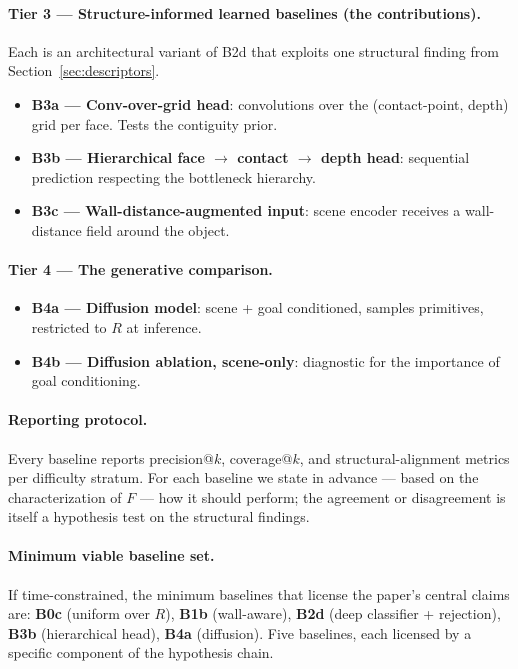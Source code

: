 \documentclass[11pt]{article}
\begin{document}
\paragraph{Tier 3 --- Structure-informed learned baselines (the contributions).}
Each is an architectural variant of B2d that exploits one structural finding
from Section~\ref{sec:descriptors}.
\begin{itemize}[leftmargin=2em,itemsep=0pt]
  \item \textbf{B3a --- Conv-over-grid head}: convolutions over the
        (contact-point, depth) grid per face. Tests the contiguity prior.
  \item \textbf{B3b --- Hierarchical face $\to$ contact $\to$ depth head}:
        sequential prediction respecting the bottleneck hierarchy.
  \item \textbf{B3c --- Wall-distance-augmented input}: scene encoder
        receives a wall-distance field around the object.
\end{itemize}

\paragraph{Tier 4 --- The generative comparison.}
\begin{itemize}[leftmargin=2em,itemsep=0pt]
  \item \textbf{B4a --- Diffusion model}: scene + goal conditioned, samples
        primitives, restricted to $R$ at inference.
  \item \textbf{B4b --- Diffusion ablation, scene-only}: diagnostic for the
        importance of goal conditioning.
\end{itemize}

\paragraph{Reporting protocol.}
Every baseline reports precision@$k$, coverage@$k$, and structural-alignment
metrics per difficulty stratum. For each baseline we state in advance --- based
on the characterization of $F$ --- how it should perform; the agreement or
disagreement is itself a hypothesis test on the structural findings.

\paragraph{Minimum viable baseline set.}
If time-constrained, the minimum baselines that license the paper's central
claims are: \textbf{B0c} (uniform over $R$), \textbf{B1b} (wall-aware),
\textbf{B2d} (deep classifier + rejection), \textbf{B3b} (hierarchical head),
\textbf{B4a} (diffusion). Five baselines, each licensed by a specific
component of the hypothesis chain.
\end{document}

